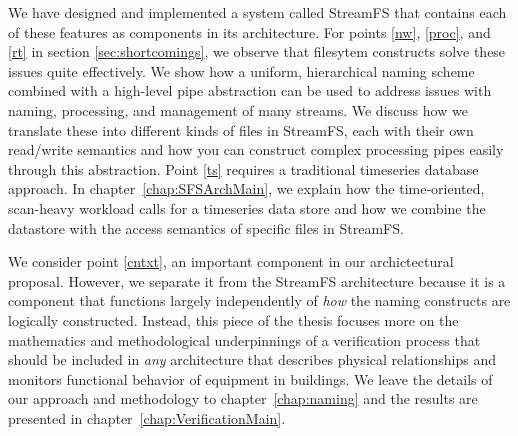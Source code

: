 We have designed and implemented a system called StreamFS that contains each of these features as components in its architecture.
For points \ref{nw}, \ref{proc}, and \ref{rt} in section \ref{sec:shortcomings}, we observe that filesytem constructs solve these 
issues quite effectively.  We show
how a uniform, hierarchical naming scheme combined with a high-level pipe abstraction can be used to address issues with naming, processing,
and management of many streams.  We discuss how we translate these into different kinds of files in StreamFS, each with their
own read/write semantics and how you can construct complex processing pipes easily through this abstraction.  Point \ref{ts} requires
a traditional timeseries database approach.  In chapter~\ref{chap:SFSArchMain}, we explain how the time-oriented, scan-heavy
workload calls for a timeseries data store and how we combine the datastore with the access semantics of specific files in
StreamFS.

We consider point \ref{cntxt}, an important component in our archictectural proposal.  However, 
we separate it from the StreamFS architecture because it is a component that functions largely independently of \emph{how} the naming
constructs are logically constructed.  Instead, this piece of the thesis focuses more on the mathematics and methodological
underpinnings of a verification process that should be included in \emph{any} architecture that describes physical relationships
and monitors functional behavior of equipment in buildings.  We leave the details of our approach and methodology to chapter~\ref{chap:naming}
and the results are presented in chapter~\ref{chap:VerificationMain}.